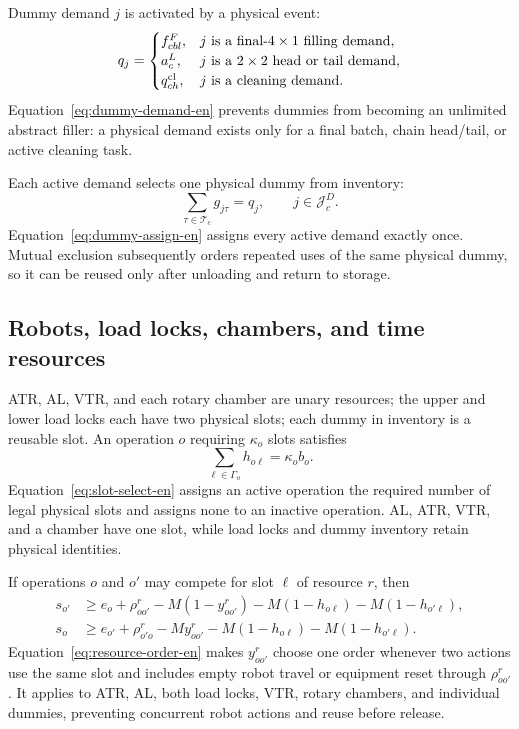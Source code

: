 \documentclass[final,5p,times,twocolumn]{elsarticle}
\begin{document}
Dummy demand $j$ is activated by a physical event:
\begin{equation}
q_j=
\begin{cases}
f^F_{cbl},&j\text{ is a final-$4\times1$ filling demand},\\
a^L_c,&j\text{ is a $2\times2$ head or tail demand},\\
q^{\rm cl}_{ch},&j\text{ is a cleaning demand}.
\end{cases}
\label{eq:dummy-demand-en}
\end{equation}
Equation~\eqref{eq:dummy-demand-en} prevents dummies from becoming an unlimited abstract filler: a physical demand exists only for a final batch, chain head/tail, or active cleaning task.

Each active demand selects one physical dummy from inventory:
\begin{equation}
\sum_{\tau\in\mathcal T_c}g_{j\tau}=q_j,
\qquad j\in\mathcal J_c^D.
\label{eq:dummy-assign-en}
\end{equation}
Equation~\eqref{eq:dummy-assign-en} assigns every active demand exactly once. Mutual exclusion subsequently orders repeated uses of the same physical dummy, so it can be reused only after unloading and return to storage.

\subsection{Robots, load locks, chambers, and time resources}

ATR, AL, VTR, and each rotary chamber are unary resources; the upper and lower load locks each have two physical slots; each dummy in inventory is a reusable slot. An operation $o$ requiring $\kappa_o$ slots satisfies
\begin{equation}
\sum_{\ell\in\Gamma_o}h_{o\ell}=\kappa_ob_o.
\label{eq:slot-select-en}
\end{equation}
Equation~\eqref{eq:slot-select-en} assigns an active operation the required number of legal physical slots and assigns none to an inactive operation. AL, ATR, VTR, and a chamber have one slot, while load locks and dummy inventory retain physical identities.

If operations $o$ and $o'$ may compete for slot $\ell$ of resource $r$, then
\begin{equation}
\begin{aligned}
s_{o'}&\ge e_o+\rho^r_{oo'}-M(1-y^r_{oo'})
-M(1-h_{o\ell})-M(1-h_{o'\ell}),\\
s_o&\ge e_{o'}+\rho^r_{o'o}-My^r_{oo'}
-M(1-h_{o\ell})-M(1-h_{o'\ell}).
\end{aligned}
\label{eq:resource-order-en}
\end{equation}
Equation~\eqref{eq:resource-order-en} makes $y^r_{oo'}$ choose one order whenever two actions use the same slot and includes empty robot travel or equipment reset through $\rho^r_{oo'}$. It applies to ATR, AL, both load locks, VTR, rotary chambers, and individual dummies, preventing concurrent robot actions and reuse before release.
\end{document}

